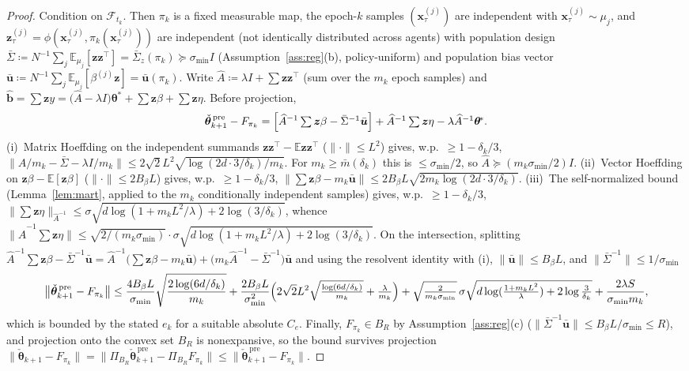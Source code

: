 \documentclass[11pt]{article}
\begin{document}
\begin{proof}
Condition on $\mathcal F_{t_k}$. Then $\pi_k$ is a fixed measurable
map, the epoch-$k$ samples
$(\bm x_\tau^{(j)})$ are independent with
$\bm x_\tau^{(j)}\sim\mu_j$, and
$\bm z_\tau^{(j)}=\phi(\bm x_\tau^{(j)},\pi_k(\bm x_\tau^{(j)}))$ are
independent (not identically distributed across agents) with
population design
$\bar\Sigma\coloneqq N^{-1}\sum_j\mathbb E_{\mu_j}[\bm z\bm z^\top]
=\bar\Sigma_z(\pi_k)\succeq\sigma_{\min}I$
(Assumption~\ref{ass:reg}(b), policy-uniform) and population bias
vector
$\bar{\bm u}\coloneqq N^{-1}\sum_j\mathbb E_{\mu_j}[\beta^{(j)}\bm z]
=\bar{\bm u}(\pi_k)$.
Write $\widehat A\coloneqq\lambda I+\sum\bm z\bm z^\top$ (sum over the
$m_k$ epoch samples) and
$\widehat{\bm b}=\sum\bm z y
=\bigl(\widehat A-\lambda I\bigr)\bm\theta^{\!*}
+\sum\bm z\beta+\sum\bm z\eta$.  Before projection,
\[
\check{\bm\theta}_{k+1}^{\,\mathrm{pre}}-F_{\pi_k}
=\Bigl[\widehat A^{-1}\textstyle\sum\bm z\beta
-\bar\Sigma^{-1}\bar{\bm u}\Bigr]
+\widehat A^{-1}\textstyle\sum\bm z\eta
-\lambda\widehat A^{-1}\bm\theta^{\!*}.
\]
(i)~Matrix Hoeffding \citep{tropp2012} on the independent summands
$\bm z\bm z^\top-\mathbb E\bm z\bm z^\top$ ($\|\cdot\|\leq L^2$)
gives, w.p.\ $\geq 1-\delta_k/3$,
$\|\widehat A/m_k-\bar\Sigma-\lambda I/m_k\|
\leq 2\sqrt2 L^2\sqrt{\log(2d\cdot 3/\delta_k)/m_k}$. For
$m_k\geq\bar m(\delta_k)$ this is $\leq\sigma_{\min}/2$, so
$\widehat A\succeq(m_k\sigma_{\min}/2)I$.
(ii)~Vector Hoeffding \citep{hayes2005} on
$\bm z\beta-\mathbb E[\bm z\beta]$ ($\|\cdot\|\leq 2B_\beta L$)
gives, w.p.\ $\geq 1-\delta_k/3$,
$\|\sum\bm z\beta-m_k\bar{\bm u}\|
\leq 2B_\beta L\sqrt{2m_k\log(2d\cdot3/\delta_k)}$.
(iii)~The self-normalized bound (Lemma~\ref{lem:mart}, applied to the
$m_k$ conditionally independent samples) gives, w.p.\
$\geq 1-\delta_k/3$,
$\|\sum\bm z\eta\|_{\widehat A^{-1}}
\leq\sigma\sqrt{d\log(1+m_kL^2/\lambda)+2\log(3/\delta_k)}$,
whence
$\|\widehat A^{-1}\sum\bm z\eta\|
\leq\sqrt{2/(m_k\sigma_{\min})}\cdot
\sigma\sqrt{d\log(1+m_kL^2/\lambda)+2\log(3/\delta_k)}$.
On the intersection, splitting
$\widehat A^{-1}\sum\bm z\beta-\bar\Sigma^{-1}\bar{\bm u}
=\widehat A^{-1}\bigl(\sum\bm z\beta-m_k\bar{\bm u}\bigr)
+\bigl(m_k\widehat A^{-1}-\bar\Sigma^{-1}\bigr)\bar{\bm u}$
and using the resolvent identity with (i),
$\|\bar{\bm u}\|\leq B_\beta L$, and
$\|\bar\Sigma^{-1}\|\leq 1/\sigma_{\min}$ \[
\bigl\|\check{\bm\theta}_{k+1}^{\,\mathrm{pre}}-F_{\pi_k}\bigr\|
\leq
\frac{4B_\beta L}{\sigma_{\min}}\sqrt{\frac{2\log(6d/\delta_k)}{m_k}}
+\frac{2B_\beta L}{\sigma_{\min}^2}\Bigl(2\sqrt2L^2\sqrt{\tfrac{\log(6d/\delta_k)}{m_k}}+\tfrac{\lambda}{m_k}\Bigr)
+\sqrt{\tfrac{2}{m_k\sigma_{\min}}}\,\sigma\sqrt{d\log(\tfrac{1+m_kL^2}{\lambda})+2\log\tfrac{3}{\delta_k}}
+\frac{2\lambda S}{\sigma_{\min}m_k},
\]
which is bounded by the stated $e_k$ for a suitable absolute $C_e$.
Finally, $F_{\pi_k}\in B_R$ by Assumption~\ref{ass:reg}(c)
($\|\bar\Sigma^{-1}\bar{\bm u}\|\leq B_\beta L/\sigma_{\min}\leq R$),
and projection onto the convex set $B_R$ is nonexpansive, so the bound
survives projection $\|\check{\bm\theta}_{k+1}-F_{\pi_k}\|
=\|\Pi_{B_R}\check{\bm\theta}_{k+1}^{\,\mathrm{pre}}-\Pi_{B_R}F_{\pi_k}\|
\leq\|\check{\bm\theta}_{k+1}^{\,\mathrm{pre}}-F_{\pi_k}\|$.
\end{proof}
\end{document}
